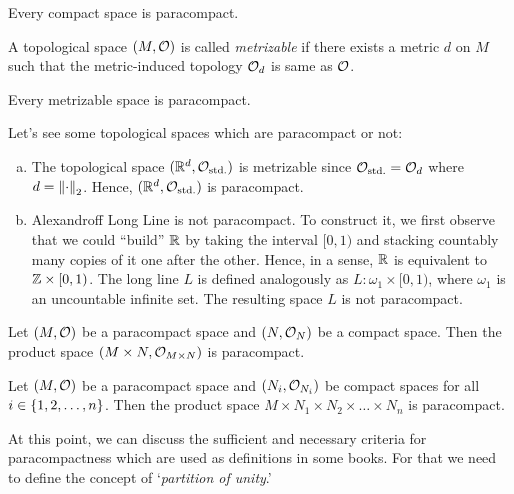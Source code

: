 \begin{corollary}
	Every compact space is paracompact.
\end{corollary}

\begin{definition}
	A topological space \((M, \mathcal{O})\) is called \emph{metrizable} if there exists a metric \(d\) on \(M\) such that the metric-induced topology \(\mathcal{O}_d\) is same as \(\mathcal{O}\).
\end{definition}

\begin{theorem}\label{thm:stone}
	Every metrizable space is paracompact.
\end{theorem}

\begin{example}
	Let's see some topological spaces which are paracompact or not:
	\begin{enumerate}[(a)]
		\item The topological space \((\mathbb R^d, \mathcal{O}_{\text{std.}})\) is metrizable since \(\mathcal{O}_{\text{std.}} = \mathcal{O}_d\) where \(d = \norm{\cdot}_2\). Hence, \((\mathbb R^d, \mathcal{O}_{\text{std.}})\) is paracompact.
		\item Alexandroff Long Line is not paracompact. To construct it, we first observe that we could ``build'' \(\mathbb R\) by taking the interval \([0,1)\) and stacking countably many copies of it one after the other. Hence, in a sense, \(\mathbb R\) is equivalent to \(\mathbb Z \times [0,1)\). The long line \(L\) is defined analogously as \(L: \omega_1 \times [0,1)\), where \(\omega_1\) is an uncountable infinite set. The resulting space \(L\) is not paracompact.
	\end{enumerate}
\end{example}

\begin{theorem}
	Let \((M, \mathcal{O})\) be a paracompact space and \((N, \mathcal{O}_N)\) be a compact space. Then the product space \((M \times N, \mathcal{O}_{M \times N})\) is paracompact.
\end{theorem}

\begin{corollary}
	Let \((M, \mathcal{O})\) be a paracompact space and \((N_i, \mathcal{O}_{N_i})\) be compact spaces for all \(i \in \qty{1, 2, \ldots, n}\). Then the product space \(M \times N_1 \times N_2 \times \ldots \times N_n\) is paracompact.
\end{corollary}

At this point, we can discuss the sufficient and necessary criteria for paracompactness which are used as definitions in some books. For that we need to define the concept of `\emph{partition of unity}.'

